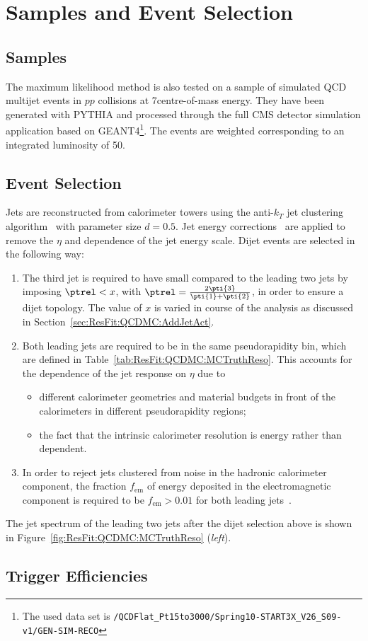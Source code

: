 \section{Samples and Event Selection}

\subsection{Samples}

The maximum likelihood method is also tested on a sample of simulated QCD multijet events in $pp$ collisions at 7\tev centre-of-mass energy.
They have been generated with PYTHIA and processed through the full CMS detector simulation application based on GEANT4\footnote{The used data set is \texttt{/QCDFlat\_Pt15to3000/Spring10-START3X\_V26\_S09-v1/GEN-SIM-RECO}}.
The events are weighted corresponding to an integrated luminosity of 50\pbinv.


\subsection{Event Selection}


Jets are reconstructed from calorimeter towers using the anti-$k_{T}$ jet clustering algorithm~\cite{bib:akj} with parameter size $d=0.5$.
Jet energy corrections~\cite{bib:cmspas:jec} are applied to remove the $\eta$ and \pt dependence of the jet energy scale.
Dijet events are selected in the following way:
\begin{enumerate}
\item The third jet is required to have small \pt compared to the leading two jets by imposing \mbox{$\ptrel < x$}, with \mbox{$\ptrel = \frac{2\pti{3}}{\pti{1} + \pti{2}}$}, in order to ensure a dijet topology.
  The value of $x$ is varied in course of the analysis as discussed in Section~\ref{sec:ResFit:QCDMC:AddJetAct}.
\item Both leading jets are required to be in the same pseudorapidity bin, which are defined in Table~\ref{tab:ResFit:QCDMC:MCTruthReso}.
  This accounts for the dependence of the jet \pt response on $\eta$ due to
  \begin{itemize}
  \item different calorimeter geometries and material budgets in front of the calorimeters in different pseudorapidity regions;
  \item the fact that the intrinsic calorimeter resolution is energy rather than \pt dependent.
  \end{itemize}
\item In order to reject jets clustered from noise in the hadronic calorimeter component, the fraction $f_{\text{em}}$ of energy deposited in the electromagnetic component is required to be \mbox{$f_{\text{em}} > 0.01$} for both leading jets~\cite{bib:cmspas:jetid}.
\end{enumerate}
The jet \ptgen spectrum of the leading two jets after the dijet selection above is shown in Figure~\ref{fig:ResFit:QCDMC:MCTruthReso} (\textit{left}).

\subsection{Trigger Efficiencies}
